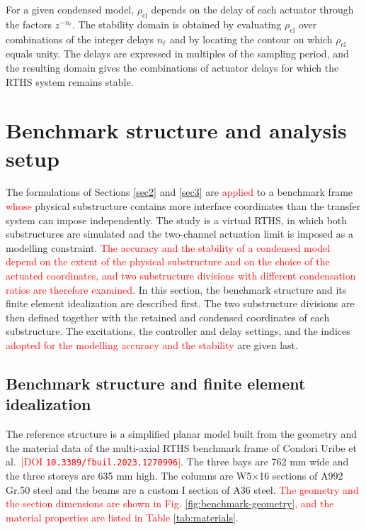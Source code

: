 \documentclass[11pt,a4paper]{article}
\numberwithin{equation}{section}
\newcommand{\rev}[1]{\textcolor{red}{#1}}
\begin{document}
For a given condensed model, \(\rho_{\mathrm{cl}}\) depends on the delay of each actuator through the factors \(z^{-n_{\ell}}\). The stability domain is obtained by evaluating \(\rho_{\mathrm{cl}}\) over combinations of the integer delays \(n_{\ell}\) and by locating the contour on which \(\rho_{\mathrm{cl}}\) equals unity. The delays are expressed in multiples of the sampling period, and the resulting domain gives the combinations of actuator delays for which the RTHS system remains stable.




\section{Benchmark structure and analysis setup} \label{sec4}

The formulations of Sections \ref{sec2} and \ref{sec3} are \rev{applied} to a benchmark frame \rev{whose} physical substructure contains more interface coordinates than the transfer system can impose independently. The study is a virtual RTHS, in which both substructures are simulated and the two-channel actuation limit is imposed as a modelling constraint. \rev{The accuracy and the stability of a condensed model depend on the extent of the physical substructure and on the choice of the actuated coordinates, and two substructure divisions with different condensation ratios are therefore examined.} In this section, the benchmark structure and its finite element idealization are described first. The two substructure divisions are then defined together with the retained and condensed coordinates of each substructure. The excitations, the controller and delay settings, and the indices \rev{adopted for the modelling accuracy and the stability} are given last.

\subsection{Benchmark structure and finite element idealization}
\label{sec:benchmark}

The reference structure is a simplified planar model built from the geometry and the material data of the multi-axial RTHS benchmark frame of Condori Uribe et al. \cite{Condori2023}\,\rev{[DOI \nolinkurl{10.3389/fbuil.2023.1270996}]}. The three bays are 762 mm wide and the three storeys are 635 mm high. The columns are W5\(\times\)16 sections of A992 Gr.50 steel and the beams are a custom I section of A36 steel. \rev{The geometry and the section dimensions are shown in Fig. \ref{fig:benchmark-geometry}, and the material properties are listed in Table \ref{tab:materials}.}
\end{document}
